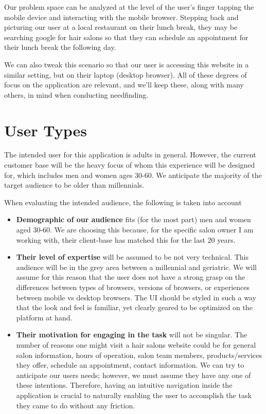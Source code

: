 Our problem space can be analyzed at the level of the user's finger tapping the mobile device and interacting with the mobile browser. Stepping back and picturing our user at a local restaurant on their lunch break, they may be searching google for hair salons so that they can schedule an appointment for their lunch break the following day.

\clearpage

We can also tweak this scenario so that our user is accessing this website in a similar setting, but on their laptop (desktop browser). All of these degrees of focus on the application are relevant, and we'll keep these, along with many others, in mind when conducting needfinding.

\section{User Types}
The intended user for this application is adults in general. However, the current customer base will be the heavy focus of whom this experience will be designed for, which includes men and women ages 30-60. We anticipate the majority of the target audience to be older than millennials.

When evaluating the intended audience, the following is taken into account

\begin{itemize}
\item
  \textbf{Demographic of our audience} fits (for the most part) men and women aged 30-60. We are choosing this because, for the specific salon owner I am working with, their client-base has matched this for the last 20 years.
\item
  \textbf{Their level of expertise} will be assumed to be not very technical. This audience will be in the grey area between a millennial and geriatric. We will assume for this reason that the user does not have a strong grasp on the differences between types of browsers, versions of browsers, or experiences between mobile vs desktop browsers. The UI should be styled in such a way that the look and feel is familiar, yet clearly geared to be optimized on the platform at hand.
\item
  \textbf{Their motivation for engaging in the task} will not be singular. The number of reasons one might visit a hair salons website could be for general salon information, hours of operation, salon team members, products/services they offer, schedule an appointment, contact information. We can try to anticipate our users needs; however, we must assume they have any one of these intentions. Therefore, having an intuitive navigation inside the application is crucial to naturally enabling the user to accomplish the task they came to do without any friction.
\end{itemize}

